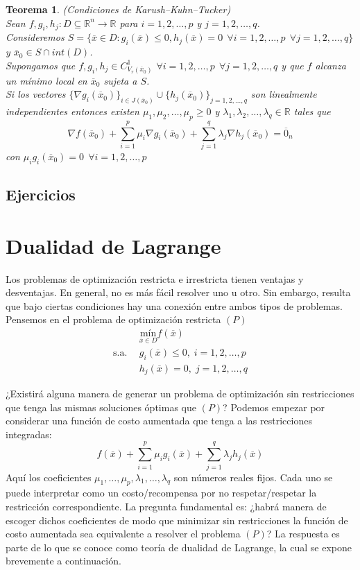 \documentclass[11pt]{report}
\newtheorem{theorem}{Teorema}[section]
\newcommand{\Rn}{\mathbb{R}^{n}}
\newcommand{\R}{\mathbb{R}}
\newcommand{\x}{\overline{x}}
\newcommand{\xz}{\overline{x}_{0}}
\newcommand{\z}{\overline{0}_{n}}
\newcommand{\Jxz}{J(\overline{x}_{0})}
\newcommand{\Sp}{1,2,\ldots, p}
\newcommand{\Sq}{1,2,\ldots, q}
\begin{document}
\begin{theorem}{(Condiciones de Karush--Kuhn--Tucker)}\\
Sean $f, g_{i}, h_{j}:D\subseteq\Rn\rightarrow\R$ para $i=\Sp$ y $j=\Sq$.\\
Consideremos $S=\{\x\in D:g_{i}(\x)\leq0, h_{j}(\x)=0\ \ \forall i=\Sp\ \ \forall j=\Sq\}$ y $\xz\in S\cap int(D)$.\\
Supongamos que $f,g_{i},h_{j}\in C_{V_{r}(\xz)}^{1}$ $\forall i=\Sp\ \ \forall j=\Sq$ y que $f$ alcanza un mínimo local en $\xz$ sujeta a $S$.\\
Si los vectores $\{\nabla g_{i}(\xz)\}_{i\in\Jxz}\cup\{h_{j}(\xz)\}_{j=\Sq}$ son linealmente independientes entonces existen $\mu_{1}, \mu_{2},\dots,\mu_{p}\geq0$ y $\lambda_{1},\lambda_{2},\ldots,\lambda_{q}\in\R$ tales que $$\nabla f(\xz)+\sum_{i=1}^{p}\mu_{i}\nabla g_{i}(\xz) + \sum_{j=1}^{q}\lambda_{j}\nabla h_{j}(\xz)=\z$$
con $\mu_{i}g_{i}(\xz)=0\ \ \forall i=\Sp$
\end{theorem}

\section*{Ejercicios}

\chapter{Dualidad de Lagrange}
Los problemas de optimización restricta e irrestricta tienen ventajas y desventajas. En general, no es más fácil resolver uno u otro. Sin embargo, resulta que bajo ciertas condiciones hay una conexión entre ambos tipos de problemas.\\


Pensemos en el problema de optimización restricta $(P)$
\begin{equation*}
\begin{aligned}
& \underset{\x\in D}{\text{mín}} f(\x) \\
\text{s.a.}\ \
& g_i(\x) \leq 0, \; i = \Sp \\
& h_j(\x)=0, \; j=\Sq
\end{aligned}
\end{equation*}

\noindent
¿Existirá alguna manera de generar un problema de optimización sin restricciones que tenga las mismas soluciones óptimas que $(P)$? Podemos empezar por considerar una función de costo aumentada que tenga a las restricciones integradas:
$$f(\x)+\sum_{i=1}^{p}\mu_{i} g_{i}(\x) + \sum_{j=1}^{q}\lambda_{j} h_{j}(\x)$$
Aquí los coeficientes $\mu_{1},\ldots,\mu_{p}, \lambda_{1},\ldots,\lambda_{q}$ son números reales fijos. Cada uno se puede interpretar como un costo/recompensa por no respetar/respetar la restricción correspondiente. La pregunta fundamental es: ¿habrá manera de escoger dichos coeficientes de modo que minimizar sin restricciones la función de costo aumentada sea equivalente a resolver el problema $(P)$? La respuesta es parte de lo que se conoce como teoría de dualidad de Lagrange, la cual se expone brevemente a continuación.\\
\end{document}
